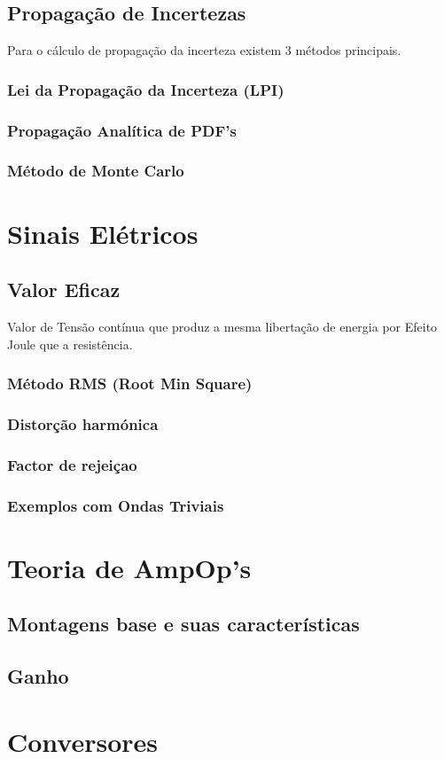 \documentclass[a4paper,12pt]{article}
\begin{document}
		\subsection{Propagação de Incertezas}
			Para o cálculo de propagação da incerteza existem 3 métodos principais.
			\subsubsection{Lei da Propagação da Incerteza (LPI)}

			\subsubsection{Propagação Analítica de PDF's}
			\subsubsection{Método de Monte Carlo}
	\section{Sinais Elétricos}
		\subsection{Valor Eficaz}
		            Valor de Tensão contínua que produz a mesma libertação de energia por Efeito Joule que a resistência.
			\subsubsection{Método RMS (Root Min Square)}\par
			

			\subsubsection{Distorção harmónica}
			\subsubsection{Factor de rejeiçao}
			\subsubsection{Exemplos com Ondas Triviais}
	\section{Teoria de AmpOp's}
		\subsection{Montagens base e suas características}
		\subsection{Ganho}
	\section{Conversores}
\end{document}
